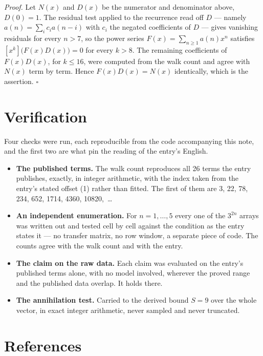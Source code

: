 \documentclass[11pt]{article}
\theoremstyle{definition}
\begin{document}
{\itshape Proof.} Let $N(x)$ and $D(x)$ be the numerator and denominator above, $D(0)=1$. The residual test applied to the recurrence read off $D$ --- namely $a(n) = \sum_i c_i a(n-i)$ with $c_i$ the negated coefficients of $D$ --- gives vanishing residuals for every $n > 7$, so the power series $F(x)=\sum_{n\ge 1}a(n)x^n$ satisfies $[x^k]\bigl(F(x)D(x)\bigr) = 0$ for every $k > 8$. The remaining coefficients of $F(x)D(x)$, for $k \le 16$, were computed from the walk count and agree with $N(x)$ term by term. Hence $F(x)D(x) = N(x)$ identically, which is the assertion. $\square$

\section{Verification}

Four checks were run, each reproducible from the code accompanying this note, and the first two are what pin the reading of the entry's English.

\begin{itemize}

\item {\bfseries The published terms.} The walk count reproduces all 26 terms the entry publishes, exactly, in integer arithmetic, with the index taken from the entry's stated offset (1) rather than fitted. The first of them are 3, 22, 78, 234, 652, 1714, 4360, 10820,~\dots

\item {\bfseries An independent enumeration.} For $n = 1,\dots,5$ every one of the $3^{2n}$ arrays was written out and tested cell by cell against the condition as the entry states it --- no transfer matrix, no row window, a separate piece of code. The counts agree with the walk count and with the entry.

\item {\bfseries The claim on the raw data.} Each claim was evaluated on the entry's published terms alone, with no model involved, wherever the proved range and the published data overlap. It holds there.

\item {\bfseries The annihilation test.} Carried to the derived bound $S = 9$ over the whole vector, in exact integer arithmetic, never sampled and never truncated.

\end{itemize}

\section{References}
\end{document}
